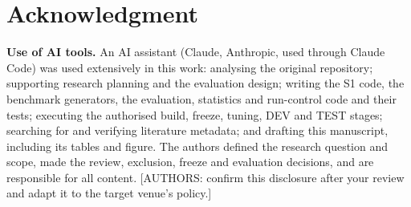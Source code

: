 \documentclass[conference]{IEEEtran}
\begin{document}
\section*{Acknowledgment}
\textbf{Use of AI tools.} An AI assistant (Claude, Anthropic, used through Claude Code) was used extensively in this
work: analysing the original repository; supporting research planning and the evaluation design; writing the S1 code,
the benchmark generators, the evaluation, statistics and run-control code and their tests; executing the authorised
build, freeze, tuning, DEV and TEST stages; searching for and verifying literature metadata; and drafting this
manuscript, including its tables and figure. The authors defined the research question and scope, made the review,
exclusion, freeze and evaluation decisions, and are responsible for all content. [AUTHORS: confirm this disclosure after
your review and adapt it to the target venue's policy.]



\end{document}

